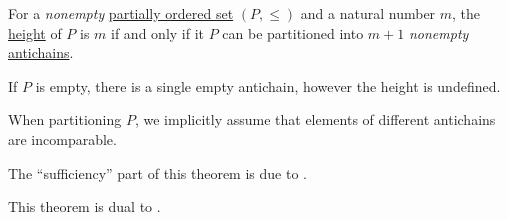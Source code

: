 \begin{theorem}\label{thm:mirsky_theorem}
  For a \emph{nonempty} \hyperref[def:partially_ordered_set]{partially ordered set} \( (P, \leq) \) and a natural number \( m \), the \hyperref[def:partial_order_connectedness/height]{height} of \( P \) is \( m \) if and only if it \( P \) can be partitioned into \( m + 1 \) \emph{nonempty} \hyperref[def:partial_order_connectedness/antichain]{antichains}.

  If \( P \) is empty, there is a single empty antichain, however the height is undefined.
\end{theorem}
\begin{comments}
  \item When partitioning \( P \), we implicitly assume that elements of different antichains are incomparable.
  \item The \enquote{sufficiency} part of this theorem is due to \textcite[thm. 2]{Mirsky1971DualOfDilworthsTheorem}.
  \item This theorem is dual to .
\end{comments}
